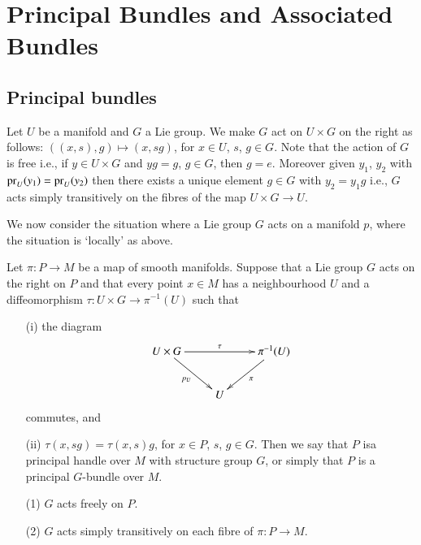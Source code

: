 \chapter{Principal Bundles and Associated Bundles}

\section*{Principal bundles}

\label{page43}

Let $U$ be a manifold and $G$ a Lie group. We make $G$ act on $U\times G$ on the right as follows: $((x,s),g)\mapsto (x,sg)$, for $x\in U$, $s$, $g\in G$. Note that the action of $G$ is free i.e., if $y\in U\times G$ and $yg=g$, $g\in G$, then $g=e$. Moreover given $y_{1}$, $y_{2}$ with $\operatorname{pr}_{U}(y_{1})=\operatorname{pr}_{U}(y_{2})$ then there exists a unique element $g\in G$ with $y_{2}=y_{1}g$ i.e., $G$ acts simply transitively on the fibres of the map $U\times G\to U$.

We now consider the situation where a Lie group $G$ acts on a manifold $p$, where the situation is `locally' as above.

\begin{defi*}
Let $\pi:P\to M$ be a map of smooth manifolds. Suppose that a Lie group $G$ acts on the right on $P$ and that every point $x\in M$ has a neighbourhood $U$ and a diffeomorphism $\tau : U\times G\to \pi^{-1}(U)$ such that
\begin{itemize}
\item[(i)] the diagram
\[
\xymatrix{
U\times G\ar[dr]_{p_{U}}\ar[rr]^-{\tau} & & \pi^{-1}(U)\ar[dl]^{\pi}\\
 & U & 
}
\]
commutes, and

\item[(ii)] $\tau(x,sg)=\tau(x,s)g$, for $x\in P$, $s$, $g\in G$. Then we say that $P$ is\pageoriginale a principal handle over $M$ with structure group $G$, or simply that $P$ is a principal $G$-bundle over $M$.
\end{itemize}
\end{defi*}

\begin{remarks*}
\begin{itemize}
\item[(1)] $G$ acts freely on $P$.

\item[(2)] $G$ acts simply transitively on each fibre of $\pi:P\to M$.
\end{itemize}
\end{remarks*}

